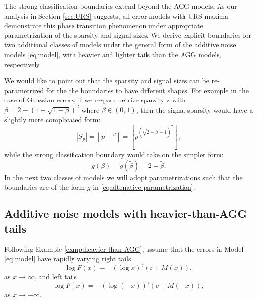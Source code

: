 The strong classification boundaries extend beyond the AGG models.
As our analysis in Section \ref{sec:URS} suggests, all error models with URS maxima demonstrate this phase transition phenomenon under appropriate parametrization of the sparsity and signal sizes.
We derive explicit boundaries for two additional classes of models under the general form of the additive noise models \eqref{eq:model}, with heavier and lighter tails than the AGG models, respectively. 

We would like to point out that the sparsity and signal sizes can be re-parametrized for the the boundaries to have different shapes.
For example in the case of Gaussian errors, if we re-parametrize sparsity $s$ with 
$\widetilde{\beta} = 2 - \left(1 + \sqrt{1-\beta}\right)^2$ where $\widetilde{\beta}\in(0,1)$, then the signal sparsity would have a slightly more complicated form:
$$
\left|S_p\right| = \left\lfloor p^{1-\beta} \right\rfloor = \left\lfloor p^{\left(\sqrt{2 - \widetilde{\beta}} - 1\right)^2}\right\rfloor,
$$
while the strong classification boundary would take on the simpler form:
\begin{equation}\label{eq:altenative-parametrization}
g(\beta) = \widetilde{g}(\widetilde{\beta}) = 2 - \widetilde{\beta}.
\end{equation}
In the next two classes of models we will adopt parametrizations such that the boundaries are of the form $\widetilde{g}$ in \eqref{eq:altenative-parametrization}.

\subsection{Additive noise models with heavier-than-AGG tails}
Following Example \ref{exmp:heavier-than-AGG}, assume that the errors in Model \eqref{eq:model} have rapidly varying right tails
\begin{equation} \label{eq:heavier-than-AGG-boundary-1}
    \log{\overline{F}(x)} = - \left(\log x\right)^\gamma \left(c+M(x)\right),
\end{equation}
as $x\to \infty$, and left tails
\begin{equation} \label{eq:heavier-than-AGG-boundary-2}
    \log{{F}(x)} = - \left(\log{(-x)}\right)^\gamma \left(c+M(-x)\right),
\end{equation}
as $x\to -\infty$.

